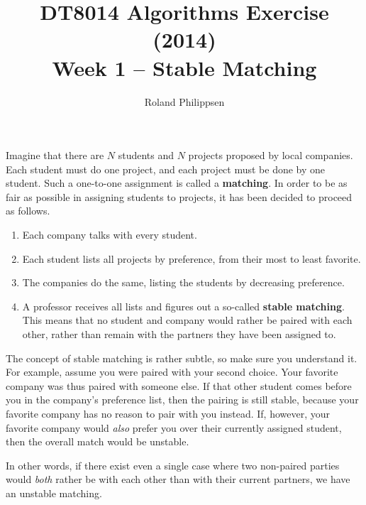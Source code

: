 \documentclass[a4paper]{article}
\begin{document}
\title{
  \large
  DT8014 Algorithms Exercise (2014)\\
  \Large
  Week 1 -- Stable Matching}
\author{Roland Philippsen}
\maketitle



Imagine that there are $N$ students and $N$ projects proposed by local companies.
Each student must do one project, and each project must be done by one student.
Such a one-to-one assignment is called a \textbf{matching}.
In order to be as fair as possible in assigning students to projects, it has been decided to proceed as follows.

\begin{enumerate}
\item
  Each company talks with every student.
\item
  Each student lists all projects by preference, from their most to least favorite.
\item
  The companies do the same, listing the students by decreasing preference.
\item
  A professor receives all lists and figures out a so-called \textbf{stable matching}.
  This means that no student and company would rather be paired with each other, rather than remain with the partners they have been assigned to.
\end{enumerate}

The concept of stable matching is rather subtle, so make sure you understand it.
For example, assume you were paired with your second choice.
Your favorite company was thus paired with someone else.
If that other student comes before you in the company's preference list, then the pairing is still stable, because your favorite company has no reason to pair with you instead.
If, however, your favorite company would \emph{also} prefer you over their currently assigned student, then the overall match would be unstable.

In other words, if there exist even a single case where two non-paired parties would \emph{both} rather be with each other than with their current partners, we have an unstable matching.
\end{document}

